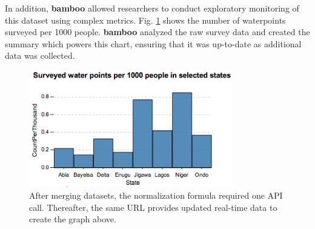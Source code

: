 \documentclass{sig-alternate}
\begin{document}
In addition, \textbf{bamboo} allowed researchers to conduct exploratory monitoring of this
dataset using complex metrics.  Fig. \ref{fig:summary} shows the number of waterpoints surveyed per 1000
people.  \textbf{bamboo} analyzed the raw survey data and created the summary
which powers this chart, ensuring that it
was up-to-date as additional data was collected.

\begin{figure}
\centering
\includegraphics[width=3.5in]{figures/summary.png}
\caption{After merging datasets, the normalization formula required one API
    call. Thereafter, the same URL provides updated real-time data to create the graph above.}
\label{fig:summary}
\end{figure}


%
%
\end{document}
